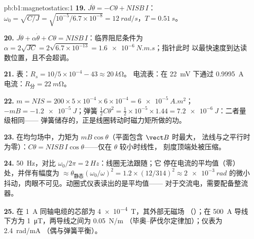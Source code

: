 \begin{solution}{pb:b1:magnetostatics:1}
\textbf{19.} $J\ddot\theta = -C\theta + NISB\,I$：$\omega_0 = \sqrt{C/J} = \sqrt{10^{-5}/6.7
\times 10^{-8}} = \qty{12}{rad/s}$，$T = \qty{0.51}{s}$。

\textbf{20.} $J\ddot\theta + \alpha\dot\theta + C\theta = NISB\,I$：临界阻尼条件为
$\alpha = 2\sqrt{JC} = 2\sqrt{6.7 \times 10^{-13}} = \qty{1.6e-6}{N.m.s}$；指针此时
以最快速度到达读数位置，且不会超调。

\textbf{21.} 表：$R_s = 10/5 \times 10^{-4} - 43 \approx \qty{20}{k\ohm}$。
电流表：在 \qty{22}{mV} 下通过 \qty{0.9995}{A} 电流：$R_{\text{分}} =
\qty{22}{m\ohm}$。

\textbf{22.} $m = NIS = 200 \times 5 \times 10^{-4} \times 6 \times 10^{-4} = \qty{6e-5}{A.m^2}$；
$-mB = \qty{-1.2e-5}{J}$；弹簧 $\tfrac12C\theta^2 = \tfrac12 \times 10^{-5} \times 1.44 =
\qty{7.2e-6}{J}$：二者量级相同——
弹簧储存的，正是线圈转动时磁力矩所做的功。

\textbf{23.} 在均匀场中，力矩为 $mB\cos\theta$（平面包含 $\vect B$ 时最大，
法线与之平行时为零）：$C\theta =
NISB\,I\cos\theta$——仅在 $\theta$ 较小时线性，
刻度顶端处被压缩。

\textbf{24.} \qty{50}{Hz}，对比 $\omega_0/2\pi = \qty{2}{Hz}$：线圈无法跟随；它
停在电流的平均值（零）处，并伴有幅度为
$\approx \theta_{\text{静态}}(\omega_0/\omega)^2 = 1.2 \times (12/314)^2 \approx
\qty{2e-3}{rad}$ 的微小抖动，肉眼不可见。动圈式仪表读出的是平均值——
对于交流电，需要配备整流器。

\textbf{25.} 在 \qty{1}{A} 同轴电缆的芯部为 \qty{4e-4}{T}，其外部无磁场
（）；在 \qty{500}{A} 导线下方为 \qty{1}{\micro T}，两导线之间为 \qty{0.05}{N/m}
（毕奥–萨伐尔定律加）；仪表为 \qty{2.4}{rad/mA}
（偶与弹簧平衡）。
\end{solution}
